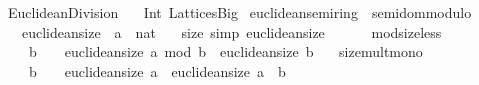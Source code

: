 %
\begin{isabellebody}%
%
%
\isadelimdocument
%
\endisadelimdocument
%
\isatagdocument
%
\isamarkuptrue%
%
\endisatagdocument
{\isafolddocument}%
%
\isadelimdocument
%
\endisadelimdocument
%
\isadelimtheory
%
\endisadelimtheory
%
\isatagtheory
{}\isamarkupfalse%
\ Euclidean{\isacharunderscore}{\kern0pt}Division\isanewline
\ \ \ Int\ Lattices{\isacharunderscore}{\kern0pt}Big\isanewline
{}%
\endisatagtheory
{\isafoldtheory}%
%
\isadelimtheory
%
\endisadelimtheory
%
\isadelimdocument
%
\endisadelimdocument
%
\isatagdocument
%
\isamarkuptrue%
%
\endisatagdocument
{\isafolddocument}%
%
\isadelimdocument
%
\endisadelimdocument
{}\isamarkupfalse%
\ euclidean{\isacharunderscore}{\kern0pt}semiring\ {\isacharequal}{\kern0pt}\ semidom{\isacharunderscore}{\kern0pt}modulo\ {\isacharplus}{\kern0pt}\ \isanewline
\ \ \ euclidean{\isacharunderscore}{\kern0pt}size\ {\isacharcolon}{\kern0pt}{\isacharcolon}{\kern0pt}\ {\isachardoublequoteopen}{\isacharprime}{\kern0pt}a\ {\isasymRightarrow}\ nat{\isachardoublequoteclose}\isanewline
\ \ \ size{\isacharunderscore}{\kern0pt}{}\ {\isacharbrackleft}{\kern0pt}simp{\isacharbrackright}{\kern0pt}{\isacharcolon}{\kern0pt}\ {\isachardoublequoteopen}euclidean{\isacharunderscore}{\kern0pt}size\ {}\ {\isacharequal}{\kern0pt}\ {}{\isachardoublequoteclose}\isanewline
\ \ \ mod{\isacharunderscore}{\kern0pt}size{\isacharunderscore}{\kern0pt}less{\isacharcolon}{\kern0pt}\ \isanewline
\ \ \ \ {\isachardoublequoteopen}b\ {\isasymnoteq}\ {}\ {\isasymLongrightarrow}\ euclidean{\isacharunderscore}{\kern0pt}size\ {\isacharparenleft}{\kern0pt}a\ mod\ b{\isacharparenright}{\kern0pt}\ {\isacharless}{\kern0pt}\ euclidean{\isacharunderscore}{\kern0pt}size\ b{\isachardoublequoteclose}\isanewline
\ \ \ size{\isacharunderscore}{\kern0pt}mult{\isacharunderscore}{\kern0pt}mono{\isacharcolon}{\kern0pt}\isanewline
\ \ \ \ {\isachardoublequoteopen}b\ {\isasymnoteq}\ {}\ {\isasymLongrightarrow}\ euclidean{\isacharunderscore}{\kern0pt}size\ a\ {\isasymle}\ euclidean{\isacharunderscore}{\kern0pt}size\ {\isacharparenleft}{\kern0pt}a\ {\isacharasterisk}{\kern0pt}\ b{\isacharparenright}{\kern0pt}{\isachardoublequoteclose}\isanewline

\end{isabellebody}
